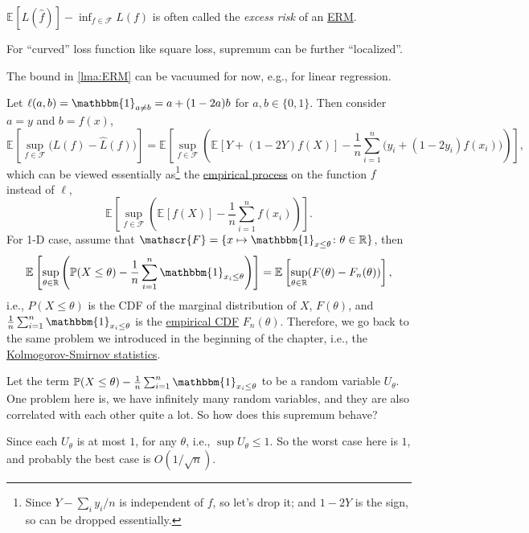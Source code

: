 \begin{notation}\label{not:excess-risk}
	\(\mathbb{E}_{}[L(\hat{f} ) ] - \inf _{f\in \mathscr{F} } L(f)\) is often called the \emph{excess risk} of an \hyperref[prb:ERM]{ERM}.
\end{notation}

\begin{remark}
	For ``curved'' loss function like square loss, supremum can be further ``localized''.
\end{remark}

\begin{remark}
	The bound in \autoref{lma:ERM} can be vacuumed for now, e.g., for linear regression.
\end{remark}

\begin{eg}\label{eg:1D-classification-thresholds}
	Let \(\ell (a, b) = \mathbbm{1}_{a \neq b} = a + (1 - 2a)b\) for \(a, b\in \{ 0, 1 \} \). Then consider \(a = y\) and \(b = f(x)\),
	\[
		\mathbb{E}_{}\left[\sup _{f\in \mathscr{F} } \big( L(f) - \hat{L} (f) \big) \right]
		= \mathbb{E}_{}\left[\sup _{f\in \mathscr{F} } \left( \mathbb{E}_{}\left[Y + (1 - 2Y)f(X) \right] - \frac{1}{n} \sum_{i=1}^{n} \big( y_i + (1 - 2y_i)f(x_i) \big) \right)  \right],
	\]
	which can be viewed essentially as\footnote{Since \(Y - \sum_{i} y_i / n\) is independent of \(f\), so let's drop it; and \(1 - 2Y\) is the sign, so can be dropped essentially.} the \hyperref[def:EP]{empirical process} on the function \(f\) instead of \(\ell \),
	\[
		\mathbb{E}_{}\left[\sup _{f\in \mathscr{F} } \left( \mathbb{E}_{}\left[f(X) \right] - \frac{1}{n}\sum_{i=1}^{n} f(x_i) \right)  \right].
	\]
	For 1-D case, assume that \(\mathscr{F} = \{ x \mapsto \mathbbm{1}_{x \leq \theta } \colon \theta \in \mathbb{R}  \}\), then
	\[
		\mathbb{E}_{}\left[\sup _{\theta \in \mathbb{R} } \left( \mathbb{P} (X \leq \theta ) - \frac{1}{n} \sum_{i=1}^{n} \mathbbm{1}_{x_i \leq \theta } \right) \right]
		= \mathbb{E}_{}\left[\sup _{\theta \in \mathbb{R} } (F(\theta ) - F_n(\theta )) \right] ,
	\]
	i.e., \(P(X \leq \theta )\) is the CDF of the marginal distribution of \(X\), \(F(\theta )\), and \(\frac{1}{n}\sum_{i=1}^{n} \mathbbm{1}_{x_i \leq \theta } \) is the \hyperref[def:empirical-CDF]{empirical CDF} \(F_n(\theta )\). Therefore, we go back to the same problem we introduced in the beginning of the chapter, i.e., the \hyperref[def:Kolmogorov-Smirnov-statistics]{Kolmogorov-Smirnov statistics}.

	Let the term \(\mathbb{P} (X \leq \theta ) - \frac{1}{n}\sum_{i=1}^{n} \mathbbm{1}_{x_i \leq \theta } \) to be a random variable \(U_\theta \). One problem here is, we have infinitely many random variables, and they are also correlated with each other quite a lot. So how does this supremum behave?

	Since each \(U_\theta \) is at most \(1\), for any \(\theta \), i.e., \(\sup U_\theta \leq 1\). So the worst case here is \(1\), and probably the best case is \(O(1 / \sqrt{n} )\).
\end{eg}